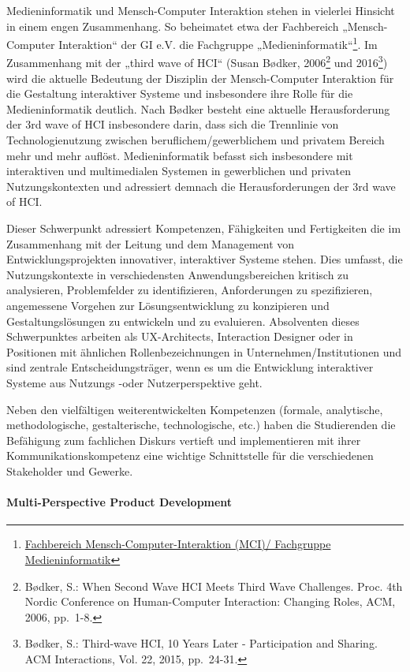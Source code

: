 Medieninformatik und Mensch-Computer Interaktion stehen in vielerlei
Hinsicht in einem engen Zusammenhang. So beheimatet etwa der Fachbereich
„Mensch-Computer Interaktion`` der GI e.V. die Fachgruppe
„Medieninformatik``\footnote{\href{http://fb-mci.gi.de/mensch-computer-interaktion-mci/fachgruppen/medieninformatik.html}{Fachbereich
  Mensch-Computer-Interaktion (MCI)/ Fachgruppe Medieninformatik}}. Im
Zusammenhang mit der „third wave of HCI`` (Susan Bødker, 2006\footnote{Bødker,
  S.: When Second Wave HCI Meets Third Wave Challenges. Proc. 4th Nordic
  Conference on Human-Computer Interaction: Changing Roles, ACM, 2006,
  pp.~1-8.} und 2016\footnote{Bødker, S.: Third-wave HCI, 10 Years Later
  - Participation and Sharing. ACM Interactions, Vol. 22, 2015,
  pp.~24-31.}) wird die aktuelle Bedeutung der Disziplin der
Mensch-Computer Interaktion für die Gestaltung interaktiver Systeme und
insbesondere ihre Rolle für die Medieninformatik deutlich. Nach Bødker
besteht eine aktuelle Herausforderung der 3rd wave of HCI insbesondere
darin, dass sich die Trennlinie von Technologienutzung zwischen
beruflichem/gewerblichem und privatem Bereich mehr und mehr auflöst.
Medieninformatik befasst sich insbesondere mit interaktiven und
multimedialen Systemen in gewerblichen und privaten Nutzungskontexten
und adressiert demnach die Herausforderungen der 3rd wave of HCI.

Dieser Schwerpunkt adressiert Kompetenzen, Fähigkeiten und Fertigkeiten
die im Zusammenhang mit der Leitung und dem Management von
Entwicklungsprojekten innovativer, interaktiver Systeme stehen. Dies
umfasst, die Nutzungskontexte in verschiedensten Anwendungsbereichen
kritisch zu analysieren, Problemfelder zu identifizieren, Anforderungen
zu spezifizieren, angemessene Vorgehen zur Lösungsentwicklung zu
konzipieren und Gestaltungslösungen zu entwickeln und zu evaluieren.
Absolventen dieses Schwerpunktes arbeiten als UX-Architects, Interaction
Designer oder in Positionen mit ähnlichen Rollenbezeichnungen in
Unternehmen/Institutionen und sind zentrale Entscheidungsträger, wenn es
um die Entwicklung interaktiver Systeme aus Nutzungs -oder
Nutzerperspektive geht.

Neben den vielfältigen weiterentwickelten Kompetenzen (formale,
analytische, methodologische, gestalterische, technologische, etc.)
haben die Studierenden die Befähigung zum fachlichen Diskurs vertieft
und implementieren mit ihrer Kommunikationskompetenz eine wichtige
Schnittstelle für die verschiedenen Stakeholder und Gewerke.

\paragraph{Multi-Perspective Product
Development\label{/mi-2017/selbstbericht/0400-studiengangskonzept/0000-studiengangskonzept}}\label{multi-perspective-product-developmentpathlabelmi-2017selbstbericht0400-studiengangskonzept0000-studiengangskonzept}

